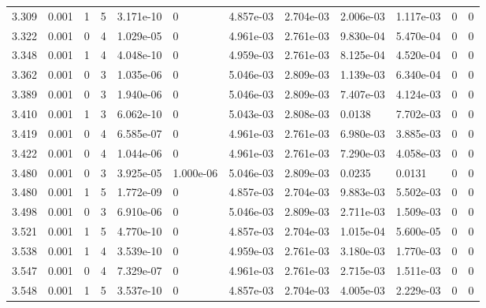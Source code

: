 \documentclass[preview]{standalone}
\begin{document}
{{{{\begin{tabular}{L{1.2cm}C{1.2cm} C{0.3cm}C{0.5cm} C{1.4cm}C{1.4cm} C{1.4cm}C{1.4cm} C{1.6cm}C{1.6cm} C{1.6cm}C{1.6cm}}
  3.309  &  0.001  & 1     &  5 &  3.171e-10  & 0  &  4.857e-03&   2.704e-03& 2.006e-03 & 1.117e-03   &  0 & 0  \\ 
  3.322  &  0.001  & 0     &  4 &  1.029e-05  & 0  &  4.961e-03&   2.761e-03& 9.830e-04 & 5.470e-04   &  0 & 0  \\ 
  3.348  &  0.001  & 1     &  4 &  4.048e-10  & 0  &  4.959e-03&   2.761e-03& 8.125e-04 & 4.520e-04   &  0 & 0  \\ 
  3.362  &  0.001  & 0     &  3 &  1.035e-06  & 0  &  5.046e-03&   2.809e-03& 1.139e-03 & 6.340e-04   &  0 & 0  \\ 
  3.389  &  0.001  & 0     &  3 &  1.940e-06  & 0  &  5.046e-03&   2.809e-03& 7.407e-03 & 4.124e-03   &  0 & 0  \\ 
  3.410  &  0.001  & 1     &  3 &  6.062e-10  & 0  &  5.043e-03&   2.808e-03& 0.0138 & 7.702e-03   &  0 & 0  \\ 
  3.419  &  0.001  & 0     &  4 &  6.585e-07  & 0  &  4.961e-03&   2.761e-03& 6.980e-03 & 3.885e-03   &  0 & 0  \\ 
  3.422  &  0.001  & 0     &  4 &  1.044e-06  & 0  &  4.961e-03&   2.761e-03& 7.290e-03 & 4.058e-03   &  0 & 0  \\ 
  3.480  &  0.001  & 0     &  3 &  3.925e-05  & 1.000e-06  &  5.046e-03&   2.809e-03& 0.0235 & 0.0131   &  0 & 0  \\ 
  3.480  &  0.001  & 1     &  5 &  1.772e-09  & 0  &  4.857e-03&   2.704e-03& 9.883e-03 & 5.502e-03   &  0 & 0  \\ 
  3.498  &  0.001  & 0     &  3 &  6.910e-06  & 0  &  5.046e-03&   2.809e-03& 2.711e-03 & 1.509e-03   &  0 & 0  \\ 
  3.521  &  0.001  & 1     &  5 &  4.770e-10  & 0  &  4.857e-03&   2.704e-03& 1.015e-04 & 5.600e-05   &  0 & 0  \\ 
  3.538  &  0.001  & 1     &  4 &  3.539e-10  & 0  &  4.959e-03&   2.761e-03& 3.180e-03 & 1.770e-03   &  0 & 0  \\ 
  3.547  &  0.001  & 0     &  4 &  7.329e-07  & 0  &  4.961e-03&   2.761e-03& 2.715e-03 & 1.511e-03   &  0 & 0  \\ 
  3.548  &  0.001  & 1     &  5 &  3.537e-10  & 0  &  4.857e-03&   2.704e-03& 4.005e-03 & 2.229e-03   &  0 & 0  \\ 
\hline 
\end{tabular} 

}}}}
\end{document}
